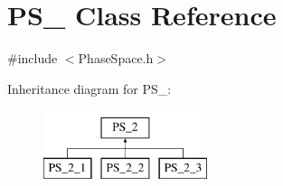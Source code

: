\hypertarget{classPS__2}{\section{P\-S\-\_ Class Reference}
\label{classPS__2}
}


{\ttfamily \#include $<$Phase\-Space.\-h$>$}

Inheritance diagram for P\-S\-\_\-:\begin{figure}[H]
\begin{center}
\leavevmode
\includegraphics[height=2.000000cm]{classPS__2}
\end{center}
\end{figure}
